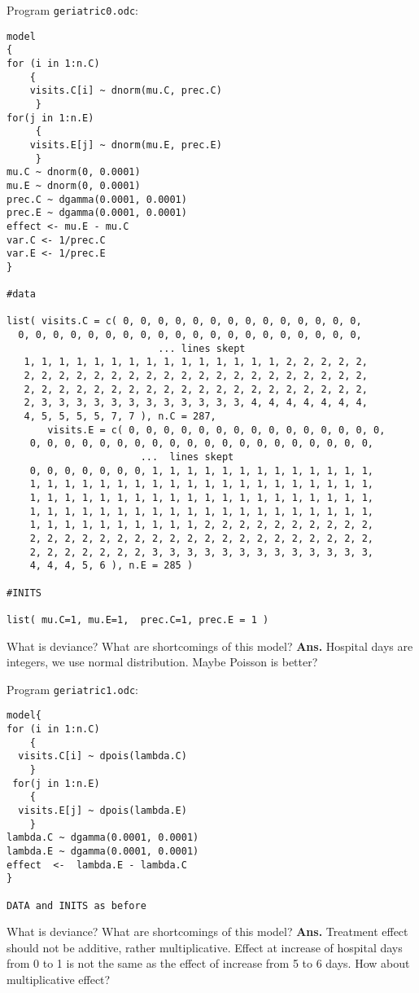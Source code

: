\documentclass[12pt]{article}
\begin{document}
 \vspace*{0.1in}
 
 Program {\tt geriatric0.odc}:
 
 \begin{verbatim}
model
{
for (i in 1:n.C)
    {
    visits.C[i] ~ dnorm(mu.C, prec.C)
     }
for(j in 1:n.E)
     {
    visits.E[j] ~ dnorm(mu.E, prec.E)
     }
mu.C ~ dnorm(0, 0.0001)
mu.E ~ dnorm(0, 0.0001)
prec.C ~ dgamma(0.0001, 0.0001)
prec.E ~ dgamma(0.0001, 0.0001)
effect <- mu.E - mu.C
var.C <- 1/prec.C
var.E <- 1/prec.E
}

#data

list( visits.C = c( 0, 0, 0, 0, 0, 0, 0, 0, 0, 0, 0, 0, 0, 0, 
  0, 0, 0, 0, 0, 0, 0, 0, 0, 0, 0, 0, 0, 0, 0, 0, 0, 0, 0, 0,
                          ... lines skept
   1, 1, 1, 1, 1, 1, 1, 1, 1, 1, 1, 1, 1, 1, 1, 2, 2, 2, 2, 2,
   2, 2, 2, 2, 2, 2, 2, 2, 2, 2, 2, 2, 2, 2, 2, 2, 2, 2, 2, 2,
   2, 2, 2, 2, 2, 2, 2, 2, 2, 2, 2, 2, 2, 2, 2, 2, 2, 2, 2, 2,
   2, 3, 3, 3, 3, 3, 3, 3, 3, 3, 3, 3, 3, 4, 4, 4, 4, 4, 4, 4,
   4, 5, 5, 5, 5, 7, 7 ), n.C = 287,
       visits.E = c( 0, 0, 0, 0, 0, 0, 0, 0, 0, 0, 0, 0, 0, 0, 0,  
    0, 0, 0, 0, 0, 0, 0, 0, 0, 0, 0, 0, 0, 0, 0, 0, 0, 0, 0, 0,
                       ...  lines skept
    0, 0, 0, 0, 0, 0, 0, 1, 1, 1, 1, 1, 1, 1, 1, 1, 1, 1, 1, 1,
    1, 1, 1, 1, 1, 1, 1, 1, 1, 1, 1, 1, 1, 1, 1, 1, 1, 1, 1, 1,
    1, 1, 1, 1, 1, 1, 1, 1, 1, 1, 1, 1, 1, 1, 1, 1, 1, 1, 1, 1,
    1, 1, 1, 1, 1, 1, 1, 1, 1, 1, 1, 1, 1, 1, 1, 1, 1, 1, 1, 1,
    1, 1, 1, 1, 1, 1, 1, 1, 1, 1, 2, 2, 2, 2, 2, 2, 2, 2, 2, 2,
    2, 2, 2, 2, 2, 2, 2, 2, 2, 2, 2, 2, 2, 2, 2, 2, 2, 2, 2, 2,
    2, 2, 2, 2, 2, 2, 2, 3, 3, 3, 3, 3, 3, 3, 3, 3, 3, 3, 3, 3,
    4, 4, 4, 5, 6 ), n.E = 285 )

#INITS

list( mu.C=1, mu.E=1,  prec.C=1, prec.E = 1 )
\end{verbatim}
What is deviance? What are shortcomings of this model?
{\bf Ans.}  Hospital days are integers, we use normal distribution.
Maybe Poisson is better?

 \vspace*{0.1in}

 Program {\tt geriatric1.odc}:

 \begin{verbatim}
model{
for (i in 1:n.C)
    {
  visits.C[i] ~ dpois(lambda.C)
    }
 for(j in 1:n.E)
    {
  visits.E[j] ~ dpois(lambda.E)
    }
lambda.C ~ dgamma(0.0001, 0.0001)
lambda.E ~ dgamma(0.0001, 0.0001)
effect  <-  lambda.E - lambda.C
}

DATA and INITS as before 
\end{verbatim}
What is deviance? What are shortcomings of this model?
{\bf Ans.}  Treatment effect should not be additive, rather multiplicative.
Effect at increase of hospital days from 0 to 1 is not the same as the effect of
increase from 5 to 6 days. How about multiplicative effect?
\end{document}
